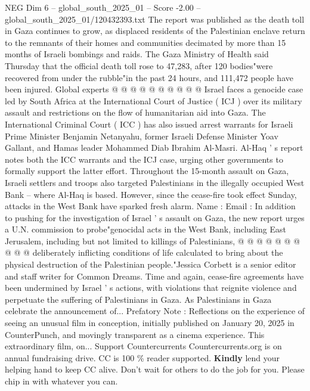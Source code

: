 \begin{textsample}{NEG Dim 6 – global\_south\_2025\_01 – Score -2.00 – global\_south\_2025\_01/120432393.txt}
The report was published as the death toll in Gaza continues to grow, as displaced residents of the Palestinian enclave return to the remnants of their homes and communities decimated by more than 15 months of Israeli bombings and raids.
The Gaza Ministry of Health said Thursday that the official death toll rose to 47,283, after 120 bodies"were recovered from under the rubble"in the past 24 hours, and 111,472 people have been injured.
Global experts @ @ @ @ @ @ @ @ @ @ Israel faces a genocide case led by South Africa at the International Court of Justice ( ICJ ) over its military assault and restrictions on the flow of humanitarian aid into Gaza.
The International Criminal Court ( ICC ) has also issued arrest warrants for Israeli Prime Minister Benjamin Netanyahu, former Israeli Defense Minister Yoav Gallant, and Hamas leader Mohammed Diab Ibrahim Al-Masri.
Al-Haq ' s report notes both the ICC warrants and the ICJ case, urging other governments to formally support the latter effort.
Throughout the 15-month assault on Gaza, Israeli settlers and troops also targeted Palestinians in the illegally occupied West Bank -- where Al-Haq is based.
However, since the cease-fire took effect Sunday, attacks in the West Bank have sparked fresh alarm.
Name : Email : In addition to pushing for the investigation of Israel ' s assault on Gaza, the new report urges a U.N. commission to probe"genocidal acts in the West Bank, including East Jerusalem, including but not limited to killings of Palestinians, @ @ @ @ @ @ @ @ @ @ deliberately inflicting conditions of life calculated to bring about the physical destruction of the Palestinian people."Jessica Corbett is a senior editor and staff writer for Common Dreams.
Time and again, cease-fire agreements have been undermined by Israel ' s actions, with violations that reignite violence and perpetuate the suffering of Palestinians in Gaza.
As Palestinians in Gaza celebrate the announcement of...
Prefatory Note : Reflections on the experience of seeing an unusual film in conception, initially published on January 20, 2025 in CounterPunch, and movingly transparent as a cinema experience.
This extraordinary film, on...
Support Countercurrents Countercurrents.org is on annual fundraising drive.
CC is 100 \% reader supported. \textbf{Kindly} lend your helping hand to keep CC alive.
Don't wait for others to do the job for you.
Please chip in with whatever you can.

\end{textsample}
